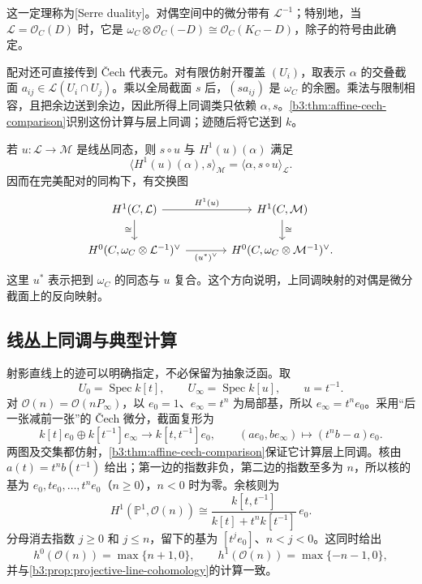 这一定理称为[Serre duality]。对偶空间中的微分带有 \(\mathcal L^{-1}\)；特别地，当 \(\mathcal L=\mathcal O_C(D)\) 时，它是 \(\omega_C\otimes\mathcal O_C(-D)\cong\mathcal O_C(K_C-D)\)，除子的符号由此确定。

\ProseParagraphBreak
配对还可直接传到 Čech 代表元。对有限仿射开覆盖 \((U_i)\)，取表示 \(\alpha\) 的交叠截面 \(a_{ij}\in\mathcal L(U_i\cap U_j)\)。乘以全局截面 \(s\) 后，\((s a_{ij})\) 是 \(\omega_C\) 的余圈。乘法与限制相容，且把余边送到余边，因此所得上同调类只依赖 \(\alpha,s\)。\cref{b3:thm:affine-cech-comparison}识别这份计算与层上同调；迹随后将它送到 \(k\)。

\ProseParagraphBreak
若 \(u:\mathcal L\rightarrow\mathcal M\) 是线丛同态，则 \(s\circ u\) 与 \(H^1(u)(\alpha)\) 满足
\[
	\langle H^1(u)(\alpha),s\rangle_{\mathcal M}
	=\langle\alpha,s\circ u\rangle_{\mathcal L}.
\]
因而在完美配对的同构下，有交换图
\[
	\begin{tikzcd}[column sep=large]
		H^1(C,\mathcal L)\arrow[r,"H^1(u)"]\arrow[d,"\cong"']
		&H^1(C,\mathcal M)\arrow[d,"\cong"]\\
		H^0(C,\omega_C\otimes\mathcal L^{-1})^\vee
		\arrow[r,"(u^*)^\vee"']
		&H^0(C,\omega_C\otimes\mathcal M^{-1})^\vee .
	\end{tikzcd}
\]
这里 \(u^*\) 表示把到 \(\omega_C\) 的同态与 \(u\) 复合。这个方向说明，上同调映射的对偶是微分截面上的反向映射。

\subsection{线丛上同调与典型计算}
\label{b3:subsec:H03:02}

射影直线上的迹可以明确指定，不必保留为抽象泛函。取
\[
	U_0=\operatorname{Spec}k[t],\qquad
	U_\infty=\operatorname{Spec}k[u],\qquad u=t^{-1}.
\]
对 \(\mathcal O(n)=\mathcal O(nP_\infty)\)，以 \(e_0=1\)、\(e_\infty=t^n\) 为局部基，所以 \(e_\infty=t^ne_0\)。采用“后一张减前一张”的 Čech 微分，截面复形为
\[
	k[t]e_0\oplus k[t^{-1}]e_\infty
	\longrightarrow k[t,t^{-1}]e_0,\qquad
	(ae_0,be_\infty)\longmapsto(t^n b-a)e_0.
\]
两图及交集都仿射，\cref{b3:thm:affine-cech-comparison}保证它计算层上同调。核由 \(a(t)=t^nb(t^{-1})\) 给出；第一边的指数非负，第二边的指数至多为 \(n\)，所以核的基为 \(e_0,te_0,\ldots,t^ne_0\)（\(n\ge0\)），\(n<0\) 时为零。余核则为
\[
	H^1(\mathbb P^1,\mathcal O(n))
	\cong\frac{k[t,t^{-1}]}{k[t]+t^nk[t^{-1}]}\,e_0.
\]
分母消去指数 \(j\ge0\) 和 \(j\le n\)，留下的基为 \([t^je_0]\)、\(n<j<0\)。这同时给出
\[
	h^0(\mathcal O(n))=\max\{n+1,0\},\qquad
	h^1(\mathcal O(n))=\max\{-n-1,0\},
\]
并与\cref{b3:prop:projective-line-cohomology}的计算一致。

